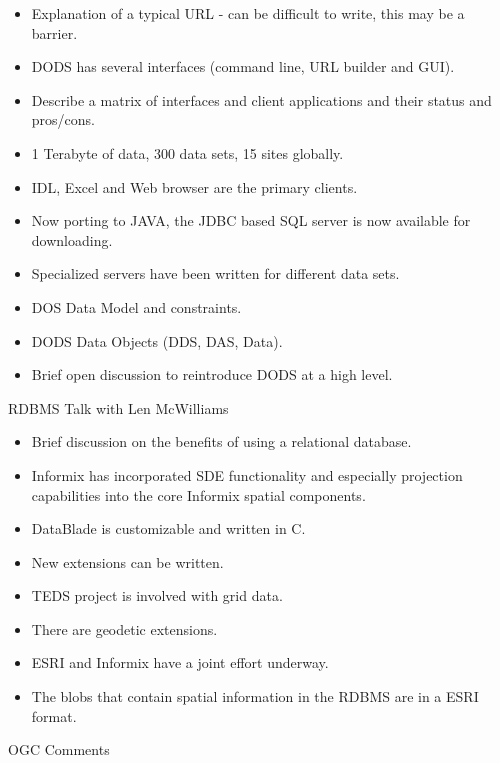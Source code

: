 \begin{itemize}
\item Explanation of a typical URL - can be difficult to write, this may be a barrier.
\item DODS has several interfaces (command line, URL builder and GUI).
\item Describe a matrix of interfaces and client applications and their status and pros/cons.
\item 1 Terabyte of data, 300 data sets, 15 sites globally.
\item IDL, Excel and Web browser are the primary clients.
\item Now porting to JAVA, the JDBC based SQL server is now available for downloading.
\item Specialized servers have been written for different data sets.
\item DOS Data Model and constraints.
\item DODS Data Objects (DDS, DAS, Data).
\item Brief open discussion to reintroduce DODS at a high level.
\end{itemize}










RDBMS Talk with Len McWilliams

\begin{itemize}
\item Brief discussion on the benefits of using a relational database.
\item Informix has incorporated SDE functionality and especially projection capabilities into 
the core Informix spatial components.
\item DataBlade is customizable and written in C.
\item New extensions can be written.
\item TEDS project is involved with grid data.
\item There are geodetic extensions.
\item ESRI and Informix have a joint effort underway.
\item The blobs that contain spatial information in the RDBMS are in a ESRI format.
\end{itemize}
        OGC Comments

